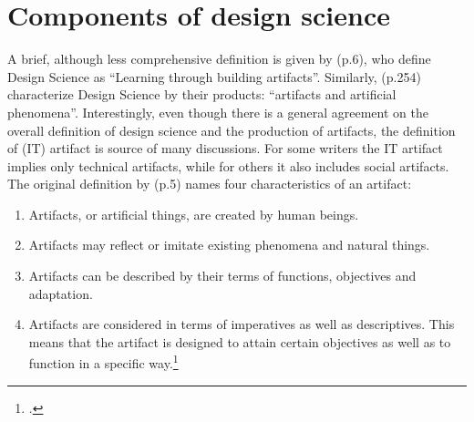 \section{Components of design science}
A brief, although less comprehensive definition is given by \cite{VaishnaviDesignScienceResearch} (p.6), who define Design Science as \enquote{Learning through building artifacts}. Similarly, \cite{MarchDesignnaturalscience1995} (p.254) characterize Design Science by their products: \enquote{artifacts and artificial phenomena}. Interestingly, even though there is a general agreement on the overall definition of design science and the production of artifacts, the definition of (IT) artifact is source of many discussions. For some writers the IT artifact implies only technical artifacts, while for others it also includes social artifacts.
The original definition by \cite{Simonsciencesartificial1996} (p.5) names four characteristics of an artifact:
\begin{enumerate}
    \item Artifacts, or artificial things, are created by human beings.
    \item Artifacts may reflect or imitate existing phenomena and natural things.
    \item Artifacts can be described by their terms of functions, objectives and adaptation.
    \item Artifacts are considered in terms of imperatives as well as descriptives. This means that the artifact is designed to attain certain objectives as well as to function in a specific way.\footcite[Cf.][p.5]{Simonsciencesartificial1996}  
\end{enumerate}

